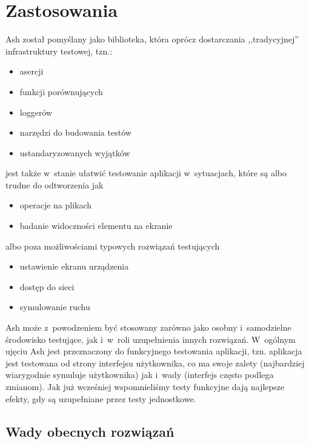 \documentclass{xmgr}
\begin{document}
\chapter{Zastosowania}
Ash został pomyślany jako biblioteka, która oprócz dostarczania ,,tradycyjnej'' infrastruktury testowej, tzn.:
\begin{itemize}
  \item asercji
  \item funkcji porównujących
  \item loggerów
  \item narzędzi do budowania testów
  \item ustandaryzowanych wyjątków
\end{itemize}
jest także w~stanie ułatwić testowanie aplikacji w~sytuacjach, które są albo trudne do odtworzenia jak
\begin{itemize}
  \item operacje na plikach
  \item badanie widoczności elementu na ekranie
\end{itemize}
 albo poza możliwościami typowych rozwiązań testujących
\begin{itemize}
  \item ustawienie ekranu urządzenia
  \item dostęp do sieci
  \item symulowanie ruchu
\end{itemize}

Ash może z~powodzeniem być stosowany zarówno jako osobny i~samodzielne środowisko testujące, jak i~w~roli uzupełnienia innych rozwiązań. W~ogólnym ujęciu Ash jest przeznaczony do funkcyjnego testowania aplikacji, tzn. aplikacja jest testowana od strony interfejsu użytkownika, co ma swoje zalety (najbardziej wiarygodnie symuluje użytkownika) jak i~wady (interfejs często podlega zmianom). Jak już wcześniej wspomnieliśmy testy funkcyjne dają najlepsze efekty, gdy są uzupełniane przez testy jednostkowe.  

\section{Wady obecnych rozwiązań}
\end{document}
